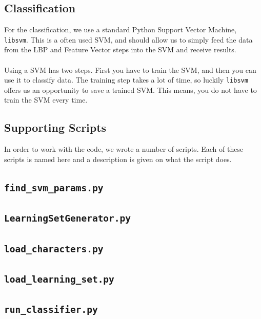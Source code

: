 \documentclass[a4paper]{article}
\begin{document}
\subsection{Classification}

For the classification, we use a standard Python Support Vector Machine,
\texttt{libsvm}. This is a often used SVM, and should allow us to simply feed
the data from the LBP and Feature Vector steps into the SVM and receive
results.\\
\\
Using a SVM has two steps. First you have to train the SVM, and then you can
use it to classify data. The training step takes a lot of time, so luckily
\texttt{libsvm} offers us an opportunity to save a trained SVM. This means,
you do not have to train the SVM every time.

\subsection{Supporting Scripts}

In order to work with the code, we wrote a number of scripts. Each of these
scripts is named here and a description is given on what the script does.

\subsection*{\texttt{find\_svm\_params.py}}



\subsection*{\texttt{LearningSetGenerator.py}}



\subsection*{\texttt{load\_characters.py}}



\subsection*{\texttt{load\_learning\_set.py}}



\subsection*{\texttt{run\_classifier.py}}
\end{document}
